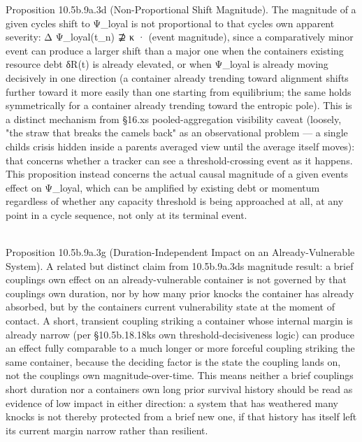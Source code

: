 \documentclass[
]{article}
\begin{document}
Proposition 10.5b.9a.3d (Non-Proportional Shift Magnitude). The
magnitude of a given cycles shift to Ψ\_loyal is not proportional to
that cycles own apparent severity: Δ Ψ\_loyal(t\_n) ⊉ κ · (event
magnitude), since a comparatively minor event can produce a larger shift
than a major one when the containers existing resource debt δR(t) is
already elevated, or when Ψ\_loyal is already moving decisively in one
direction (a container already trending toward alignment shifts further
toward it more easily than one starting from equilibrium; the same holds
symmetrically for a container already trending toward the entropic
pole). This is a distinct mechanism from §16.xs pooled-aggregation
visibility caveat (loosely, "the straw that breaks the camels back" as
an observational problem --- a single childs crisis hidden inside a
parents averaged view until the average itself moves): that concerns
whether a tracker can see a threshold-crossing event as it happens. This
proposition instead concerns the actual causal magnitude of a given
events effect on Ψ\_loyal, which can be amplified by existing debt or
momentum regardless of whether any capacity threshold is being
approached at all, at any point in a cycle sequence, not only at its
terminal event.\\
\strut \\
Proposition 10.5b.9a.3g (Duration-Independent Impact on an
Already-Vulnerable System). A related but distinct claim from
10.5b.9a.3d\textquotesingle s magnitude result: a brief
coupling\textquotesingle s own effect on an already-vulnerable container
is not governed by that coupling\textquotesingle s own duration, nor by
how many prior knocks the container has already absorbed, but by the
container\textquotesingle s current vulnerability state at the moment of
contact. A short, transient coupling striking a container whose internal
margin is already narrow (per §10.5b.18.18k\textquotesingle s own
threshold-decisiveness logic) can produce an effect fully comparable to
a much longer or more forceful coupling striking the same container,
because the deciding factor is the state the coupling lands on, not the
coupling\textquotesingle s own magnitude-over-time. This means neither a
brief coupling\textquotesingle s short duration nor a
container\textquotesingle s own long prior survival history should be
read as evidence of low impact in either direction: a system that has
weathered many knocks is not thereby protected from a brief new one, if
that history has itself left its current margin narrow rather than
resilient.
\end{document}
